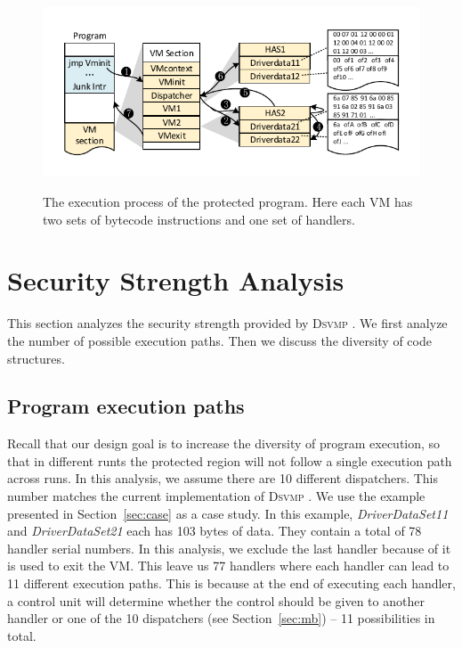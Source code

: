 \documentclass[preprint,12pt,3p]{elsarticle}
\newcommand{\DSVMP}{\textsc{Dsvmp }}
\begin{document}
\begin{figure}[!t]
  \centering
  \includegraphics[width=0.7\columnwidth]{figure/figex.pdf}\\
  \caption{The execution process of the protected program. Here each VM has two sets of bytecode instructions and one set of handlers.}\label{fig:Fig.5}
\end{figure}

\section{Security Strength Analysis}\label{sec:s-eva}
This section analyzes the security strength provided by \DSVMP. We first analyze the number of possible execution paths. Then we discuss the diversity of code structures.


\subsection{Program execution paths}
Recall that our design goal is to increase the diversity of program execution,
so that in different runts the protected region will not follow a single execution path across runs.
In this analysis, we assume there are 10 different dispatchers. This number matches the current implementation of \DSVMP.
We use the example presented in Section~\ref{sec:case} as a case study.
In this example, \emph{DriverDataSet11} and \emph{DriverDataSet21} each has 103 bytes of data.
They contain a total of 78 handler serial numbers. In this analysis, we exclude the last handler because of it is used to exit the VM.
This leave us 77 handlers where each handler can lead to 11 different execution paths.
This is because at the end of executing each handler, a control unit will determine whether the control
should be given to another handler or one of the 10 dispatchers (see Section~\ref{sec:mb}) -- 11 possibilities in total.
\end{document}
